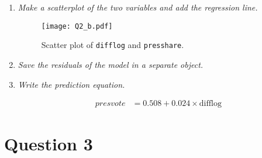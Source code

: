 \documentclass[12pt,letterpaper]{article}
\begin{document}
\begin{enumerate}
		\item \emph{Make a scatterplot of the two variables and add the regression line. }	\vspace{.25cm}
		
						  
		
		\begin{figure}[h!]\centering
			\caption{\footnotesize Scatter plot of \texttt{difflog} and \texttt{presshare}.}\vspace{-1cm}
			\label{fig:Q2_b}
			\texttt{[image: Q2\_b.pdf]}\\
		\end{figure}
		
		\item \emph{Save the residuals of the model in a separate object.}	\vspace{.25cm}
									  
		\vspace{.5cm}
		\item \emph{Write the prediction equation.}\vspace{.25cm}
		
		\begin{align*}
		presvote &= 0.508 + 0.024 \times \text{difflog}
		\end{align*}
	\end{enumerate}
\newpage
	\section*{Question 3}
	
\end{document}
